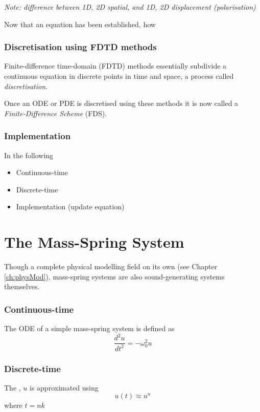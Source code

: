 \textit{Note: difference between 1D, 2D spatial, and 1D, 2D displacement (polarisation) }

Now that an equation has been established, how 


\subsubsection{Discretisation using FDTD methods}
Finite-difference time-domain (FDTD) methods essentially subdivide a continuous equation in discrete points in time and space, a process called \textit{discretisation}.

Once an ODE or PDE is discretised using these methods it is now called a \textit{Finite-Difference Scheme} (FDS).

\subsubsection{Implementation}



In the following 
\begin{itemize}
    \item Continuous-time
    \item Discrete-time
    \item Implementation (update equation)
\end{itemize}

\section{%
The Mass-Spring System}
Though a complete physical modelling field on its own (see Chapter \ref{ch:physMod}), mass-spring systems are also sound-generating systems themselves.

\subsubsection{Continuous-time}
The ODE of a simple mass-spring system is defined as
\begin{equation}\label{eq:massSpringPDE}
    \frac{d^2u}{dt^2} = -\omega_0^2u
\end{equation}

\subsubsection{Discrete-time}
The , $u$ is approximated using 
\begin{equation}
    u(t) \approx u^n
\end{equation}
where $t = nk$

